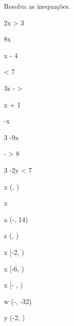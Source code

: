 

\begin{exercicio}
    Resolva as inequações.
    \begin{mathlist}[2]
        \item 2x > 3
        \item 8x 
        \item x - 4 
        \item {} < 7
        \item 3z -  > 
        \item x + 1 
        \item -x 
        \item 3 \geq -9x
        \item - > 8
        \item 3 -2y < 7
    \end{mathlist}
    \begin{answers}
        \begin{mathlist}[3]
            \item x \in \left(, \infty\right)
            \item x \in {}
            \item a \in \left(-\infty, 14\right)
            \item z \in \left(, \infty\right)
            \item x \in \left[-2, \infty\right)
            \item x \in \left[-6, \infty\right)
            \item x \in \left[- , \infty\right)
            \item w \in \left(-\infty, -32\right)
            \item y \in \left(-2, \infty\right)
        \end{mathlist}
    \end{answers}
\end{exercicio}

